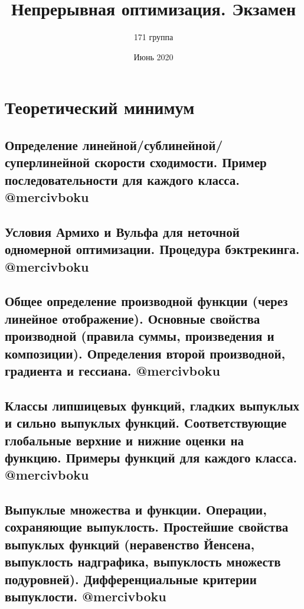 \documentclass[a4paper, 16pt]{article}
\title{
    Непрерывная оптимизация.
    Экзамен
}
\author{171 группа}
\date{Июнь 2020}
\begin{document}
    \maketitle
    \thispagestyle{first}
    \bigskip
    \newpage
    \setcounter{tocdepth}{2}
	\tableofcontents
	\newpage
	\pagestyle{plain}
    
    \section{Теоретический минимум}
    \subsection{Определение линейной/сублинейной/суперлинейной скорости сходимости. Пример последовательности для каждого класса. @mercivboku}

    

    \subsection{Условия Армихо и Вульфа для неточной одномерной оптимизации. Процедура бэктрекинга. @mercivboku}

    
    
    \subsection{Общее определение производной функции (через линейное отображение). Основные свойства производной (правила суммы, произведения и композиции). Определения второй производной, градиента и гессиана. @mercivboku}

    
    
    \subsection{Классы липшицевых функций, гладких выпуклых и сильно выпуклых функций. Соответствующие глобальные верхние и нижние оценки на функцию. Примеры функций для каждого класса. @mercivboku}

    

    \subsection{Выпуклые множества и функции. Операции, сохраняющие выпуклость. Простейшие свойства выпуклых функций (неравенство Йенсена, выпуклость надграфика, выпуклость множеств подуровней). Дифференциальные критерии выпуклости. @mercivboku}
\end{document}
